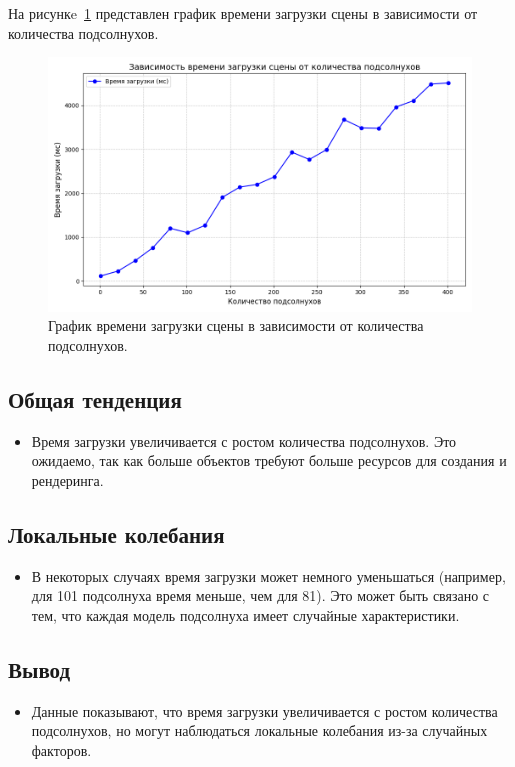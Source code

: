 На рисункe~\ref{images:graph_1} представлен график времени загрузки сцены в зависимости от количества подсолнухов.
\begin{figure}[H]
    \centering
    \includegraphics[width=155mm]{images/graph_1}
    \caption{График времени загрузки сцены в зависимости от количества подсолнухов.}
    \label{images:graph_1}
\end{figure}

\subsection{Общая тенденция}
\begin{itemize}
    \item Время загрузки увеличивается с ростом количества подсолнухов. Это ожидаемо, так как больше объектов требуют больше ресурсов для создания и рендеринга.
\end{itemize}

\subsection{Локальные колебания}
\begin{itemize}
    \item В некоторых случаях время загрузки может немного уменьшаться (например, для 101 подсолнуха время меньше, чем для 81). Это может быть связано с тем, что каждая модель подсолнуха имеет случайные характеристики.
\end{itemize}

\subsection{Вывод}
\begin{itemize}
    \item Данные показывают, что время загрузки увеличивается с ростом количества подсолнухов, но могут наблюдаться локальные колебания из-за случайных факторов.
\end{itemize}


